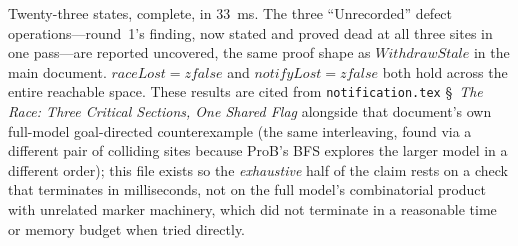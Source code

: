 \documentclass[a4paper,10pt,fleqn]{article}
\begin{document}
Twenty-three states, complete, in 33~ms.  The three ``Unrecorded''
defect operations---round~1's finding, now stated and proved dead at
all three sites in one pass---are reported uncovered, the same proof
shape as $WithdrawStale$ in the main document.  $raceLost = zfalse$ and
$notifyLost = zfalse$ both hold across the entire reachable space.
These results are cited from \texttt{notification.tex} \S~\emph{The Race: Three Critical Sections, One Shared Flag}
alongside that document's own full-model goal-directed counterexample
(the same interleaving, found via a different pair of colliding sites
because ProB's BFS explores the larger model in a different order);
this file exists so the \emph{exhaustive} half of the claim rests on a
check that terminates in milliseconds, not on the full model's
combinatorial product with unrelated marker machinery, which did not
terminate in a reasonable time or memory budget when tried directly.
\end{document}
